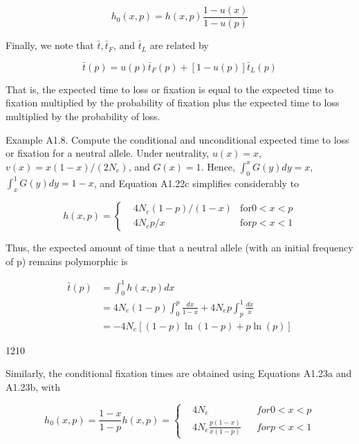 \documentclass{article}
\begin{document}
\begin{equation}
h_{0}(x,p)=h(x,p)\frac{1-u(x)}{1-u(p)}
\end{equation}

Finally, we note that  $ \bar{t}, \bar{t}_{F} $, and  $ \bar{t}_{L} $ are related by

\begin{equation}
\bar{t}(p)=u(p)\bar{t}_{F}(p)+[1-u(p)]\bar{t}_{L}(p)
\end{equation}

That is, the expected time to loss or fixation is equal to the expected time to fixation multiplied by the probability of fixation plus the expected time to loss multiplied by the probability of loss.

Example A1.8. Compute the conditional and unconditional expected time to loss or fixation for a neutral allele. Under neutrality,  $ u(x) = x $,  $ v(x) = x(1 - x)/(2N_e) $, and  $ G(x) = 1 $. Hence,  $ \int_0^x G(y) dy = x $,  $ \int_x^1 G(y) dy = 1 - x $, and Equation A1.22c simplifies considerably to

\begin{equation}
h(x,p)=\left\{\begin{aligned}&4N_{e}(1-p)/(1-x)&\text{for}0<x<p\\ &4N_{e}p/x&\text{for}p<x<1\end{aligned}\right.
\end{equation}

Thus, the expected amount of time that a neutral allele (with an initial frequency of p) remains polymorphic is

\begin{equation}
\begin{aligned}\bar{t}(p)&=\int_{0}^{1}h(x,p)dx\\&=4N_{e}(1-p)\int_{0}^{p}\frac{dx}{1-x}+4N_{e}p\int_{p}^{1}\frac{dx}{x}\\&=-4N_{e}[(1-p)\ln(1-p)+p\ln(p)]\end{aligned}
\end{equation}

1210

Similarly, the conditional fixation times are obtained using Equations A1.23a and A1.23b, with

\begin{equation}
h_{0}(x,p)=\frac{1-x}{1-p}h(x,p)=\left\{\begin{aligned}&4N_{e}&&for0<x<p\\ &4N_{e}\frac{p(1-x)}{x(1-p)}&&for p<x<1\end{aligned}\right.
\end{equation}
\end{document}
